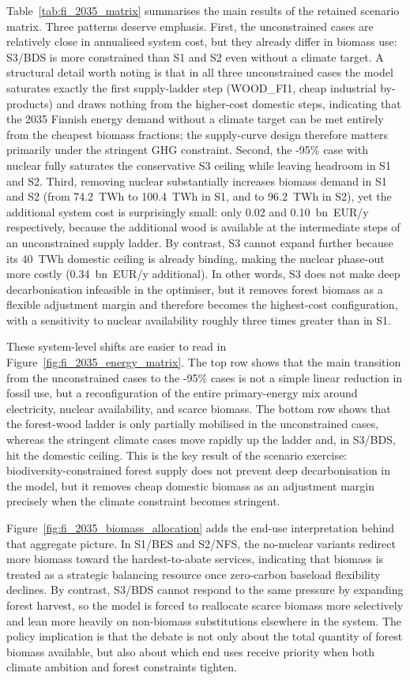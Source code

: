 \documentclass{article}
\begin{document}
Table~\ref{tab:fi_2035_matrix} summarises the main results of the retained scenario matrix. Three patterns deserve emphasis. First, the unconstrained cases are relatively close in annualised system cost, but they already differ in biomass use: S3/BDS is more constrained than S1 and S2 even without a climate target. A structural detail worth noting is that in all three unconstrained cases the model saturates exactly the first supply-ladder step (WOOD\_FI1, cheap industrial by-products) and draws nothing from the higher-cost domestic steps, indicating that the 2035 Finnish energy demand without a climate target can be met entirely from the cheapest biomass fractions; the supply-curve design therefore matters primarily under the stringent GHG constraint. Second, the -95\% case with nuclear fully saturates the conservative S3 ceiling while leaving headroom in S1 and S2. Third, removing nuclear substantially increases biomass demand in S1 and S2 (from 74.2~TWh to 100.4~TWh in S1, and to 96.2~TWh in S2), yet the additional system cost is surprisingly small: only 0.02 and 0.10~bn~EUR/y respectively, because the additional wood is available at the intermediate steps of an unconstrained supply ladder. By contrast, S3 cannot expand further because its 40~TWh domestic ceiling is already binding, making the nuclear phase-out more costly (0.34~bn~EUR/y additional). In other words, S3 does not make deep decarbonisation infeasible in the optimiser, but it removes forest biomass as a flexible adjustment margin and therefore becomes the highest-cost configuration, with a sensitivity to nuclear availability roughly three times greater than in S1.

These system-level shifts are easier to read in Figure~\ref{fig:fi_2035_energy_matrix}. The top row shows that the main transition from the unconstrained cases to the -95\% cases is not a simple linear reduction in fossil use, but a reconfiguration of the entire primary-energy mix around electricity, nuclear availability, and scarce biomass. The bottom row shows that the forest-wood ladder is only partially mobilised in the unconstrained cases, whereas the stringent climate cases move rapidly up the ladder and, in S3/BDS, hit the domestic ceiling. This is the key result of the scenario exercise: biodiversity-constrained forest supply does not prevent deep decarbonisation in the model, but it removes cheap domestic biomass as an adjustment margin precisely when the climate constraint becomes stringent.

Figure~\ref{fig:fi_2035_biomass_allocation} adds the end-use interpretation behind that aggregate picture. In S1/BES and S2/NFS, the no-nuclear variants redirect more biomass toward the hardest-to-abate services, indicating that biomass is treated as a strategic balancing resource once zero-carbon baseload flexibility declines. By contrast, S3/BDS cannot respond to the same pressure by expanding forest harvest, so the model is forced to reallocate scarce biomass more selectively and lean more heavily on non-biomass substitutions elsewhere in the system. The policy implication is that the debate is not only about the total quantity of forest biomass available, but also about which end uses receive priority when both climate ambition and forest constraints tighten.
\end{document}
